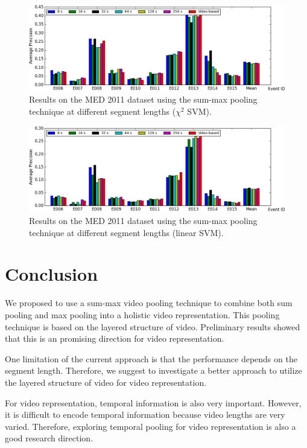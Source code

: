 \begin{figure}[!htb]
	\centering
	\includegraphics[width=1\textwidth]{med11_summax_kernel.png}
	\caption{Results on the MED 2011 dataset using the sum-max pooling technique at different segment lengths (${\chi}^2$ SVM).}
	\label{f_med11_summax_kernel}
\end{figure}

\begin{figure}[!htb]
	\centering
	\includegraphics[width=1\textwidth]{med11_summax_linear.png}
	\caption{Results on the MED 2011 dataset using the sum-max pooling technique at different segment lengths (linear SVM).}
	\label{f_med11_summax_linear}
\end{figure}


\section{Conclusion}
\label{sec:majhead}

We proposed to use a sum-max video pooling technique to combine both sum pooling and max pooling into a holistic video representation. This pooling technique is based on the layered structure of video. Preliminary results showed that this is an promising direction for video representation.

One limitation of the current approach is that the performance depends on the segment length. Therefore, we suggest to investigate a better approach to utilize the layered structure of video for video representation.

For video representation, temporal information is also very important. However, it is difficult to encode temporal information because video lengths are very varied. Therefore, exploring temporal pooling for video representation is also a good research direction.  

